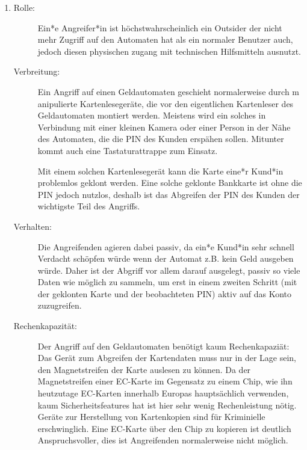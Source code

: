 \documentclass[a4paper,11pt]{scrartcl}
\begin{document}
\begin{enumerate}[1.]
    \item 
        \begin{description}
            \item[Rolle:]
                Ein*e Angreifer*in ist höchstwahrscheinlich ein Outsider der nicht 
                mehr Zugriff auf den Automaten hat als ein normaler Benutzer auch,
                jedoch diesen physischen zugang mit technischen Hilfsmitteln ausnutzt.

            \item[Verbreitung:]
                Ein Angriff auf einen Geldautomaten geschieht normalerweise durch m
                anipulierte Kartenlesegeräte, die vor den eigentlichen Kartenleser des 
                Geldautomaten montiert werden. Meistens wird ein solches in Verbindung 
                mit einer kleinen Kamera oder einer Person in der Nähe des Automaten, 
                die die PIN des Kunden erspähen sollen. Mitunter kommt auch eine 
                Tastaturattrappe zum Einsatz.

                Mit einem solchen Kartenlesegerät kann die Karte eine*r Kund*in problemlos 
                geklont werden. Eine solche geklonte Bankkarte ist ohne die PIN jedoch nutzlos, 
                deshalb ist das Abgreifen der PIN des Kunden der wichtigste Teil des Angriffs.

            \item[Verhalten:]
                Die Angreifenden agieren dabei passiv, da ein*e Kund*in sehr schnell Verdacht 
                schöpfen würde wenn der Automat z.B. kein Geld ausgeben würde. Daher ist 
                der Abgriff vor allem darauf ausgelegt, passiv so viele Daten wie möglich 
                zu sammeln, um erst in einem zweiten Schritt (mit der geklonten Karte und 
                der beobachteten PIN) aktiv auf das Konto zuzugreifen.

            \item[Rechenkapazität:]
            	Der Angriff auf den Geldautomaten benötigt kaum Rechenkapaziät: Das Gerät
            	zum Abgreifen der Kartendaten muss nur in der Lage sein, den Magnetstreifen der Karte
            	auslesen zu können. Da der Magnetstreifen einer EC-Karte im Gegensatz zu einem
            	Chip, wie ihn heutzutage EC-Karten innerhalb Europas hauptsächlich verwenden, kaum
            	Sicherheitsfeatures hat ist hier sehr wenig Rechenleistung nötig. Geräte zur
            	Herstellung von Kartenkopien sind für Kriminielle erschwinglich.
            	Eine EC-Karte über den Chip zu kopieren ist deutlich Anspruchsvoller, dies ist
            	Angreifenden normalerweise nicht möglich.
        \end{description}
\end{enumerate}
\end{document}
